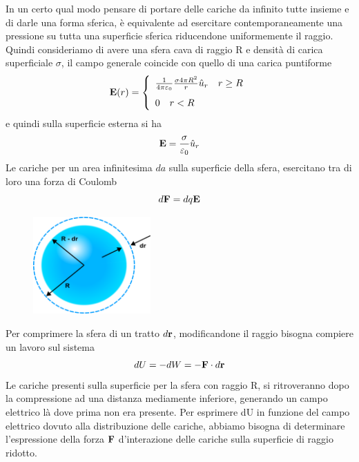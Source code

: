 \noindent In un certo qual modo pensare di portare delle cariche da infinito tutte insieme e di darle una forma sferica, \`e equivalente ad esercitare contemporaneamente una pressione su tutta una superficie  sferica riducendone uniformemente il raggio. Quindi consideriamo di avere una sfera cava di raggio R e densit\`a di carica superficiale $\sigma $, il campo generale coincide con quello di una carica puntiforme
\begin{equation*}
\bold{E}(r) = \left \{ \begin{array}{l}
	 \frac{1}{4 \pi \varepsilon_0} \frac{\sigma 4 \pi R^2}{r} \hat{u}_{r} \quad r \geq R\\[0.3cm]
	0 \quad r < R
\end{array}\right.
\end{equation*}
e quindi sulla superficie esterna si ha 
\begin{equation*}
	\bold{E} =  \frac{\sigma}{\varepsilon_0} \hat{u}_{r}
\end{equation*}
Le cariche per un area infinitesima $da$ sulla superficie della sfera, esercitano tra di loro una forza di Coulomb 
\begin{equation*}
	d\bold{F} = dq \bold{E}
\end{equation*}
\begin{figure} %
    \centering
    \includegraphics[width=0.4\textwidth]{images/pressure} %
\end{figure}
Per comprimere la sfera di un tratto $d\bold{r}$, modificandone il raggio bisogna compiere un lavoro sul sistema 
\begin{equation*}
	dU = -dW = -\bold{F} \cdot d\bold{r}
\end{equation*}  
 Le cariche presenti sulla superficie per la sfera con raggio R, si ritroveranno dopo la compressione ad una distanza mediamente inferiore, generando un campo elettrico l\`a dove prima non era presente. Per esprimere dU in funzione del campo elettrico dovuto alla distribuzione delle cariche, abbiamo bisogna di determinare l'espressione della forza $\bold{F}$ d'interazione delle cariche sulla superficie di raggio ridotto.
 
